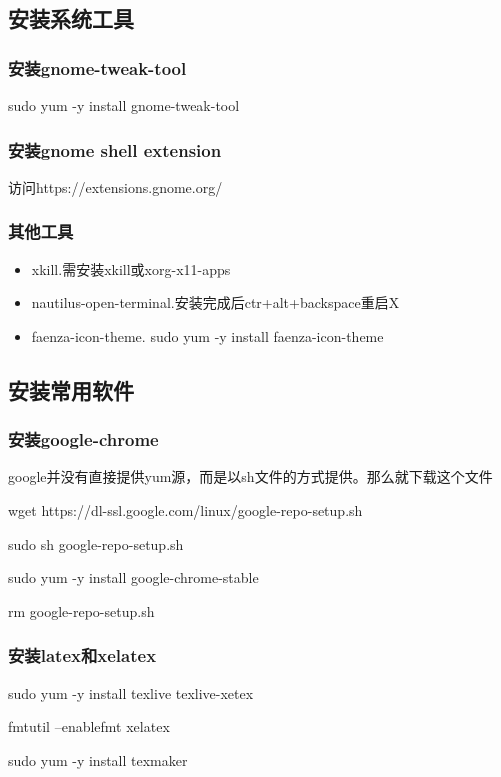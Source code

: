 \subsection{安装系统工具}
\subsubsection{安装gnome-tweak-tool}
\begin{shellcmd}
sudo yum -y install gnome-tweak-tool
\end{shellcmd}
\subsubsection{安装gnome shell extension}
访问https://extensions.gnome.org/
\subsubsection{其他工具}
\begin{itemize}
\item xkill.需安装xkill或xorg-x11-apps
\item nautilus-open-terminal.安装完成后ctr+alt+backspace重启X
\item faenza-icon-theme.
sudo yum -y install faenza-icon-theme
\end{itemize}

\subsection{安装常用软件}
\subsubsection{安装google-chrome}
google并没有直接提供yum源，而是以sh文件的方式提供。那么就下载这个文件
\begin{shellcmd}
wget https://dl-ssl.google.com/linux/google-repo-setup.sh

sudo sh google-repo-setup.sh 

sudo yum -y install google-chrome-stable

rm google-repo-setup.sh 
\end{shellcmd}
\subsubsection{安装latex和xelatex}
\begin{shellcmd}
sudo yum -y install texlive texlive-xetex

fmtutil --enablefmt xelatex

sudo yum -y install texmaker
\end{shellcmd}

